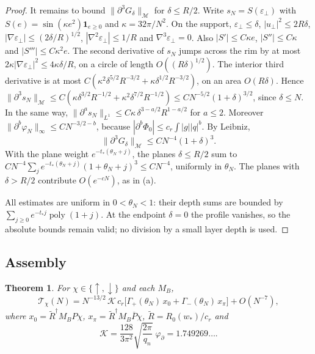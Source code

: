 \documentclass[11pt]{amsart}
\newtheorem{theorem}{Theorem}[section]
\theoremstyle{definition}
\theoremstyle{remark}
\newcommand{\cK}{\mathcal{K}}
\newcommand{\up}{{\uparrow}}
\newcommand{\dn}{{\downarrow}}
\begin{document}
\begin{proof}
It remains to bound $\|\partial^3G_\delta\|_{\mathcal M}$ for $\delta\le R/2$.
Write $s_N=S(\varepsilon_\perp)$ with $S(e)=\sin(\kappa e^2)\mathbf 1_{e\ge0}$
and $\kappa=32\pi/N^2$.  On the support, $\varepsilon_\perp\le\delta$,
$|u_\perp|^2\le2R\delta$, $|\nabla\varepsilon_\perp|\le(2\delta/R)^{1/2}$,
$|\nabla^2\varepsilon_\perp|\le1/R$ and $\nabla^3\varepsilon_\perp=0$.  Also
$|S'|\le C\kappa e$, $|S''|\le C\kappa$ and $|S'''|\le C\kappa^2e$.  The
second derivative of $s_N$ jumps across the rim by at most
$2\kappa|\nabla\varepsilon_\perp|^2\le4\kappa\delta/R$, on a circle of length
$O((R\delta)^{1/2})$.  The interior third derivative is at most
$C(\kappa^2\delta^{5/2}R^{-3/2}+\kappa\delta^{1/2}R^{-3/2})$, on an area
$O(R\delta)$.  Hence
$\|\partial^3s_N\|_{\mathcal M}\le C(\kappa\delta^{3/2}R^{-1/2}+\kappa^2\delta^{7/2}R^{-1/2})\le CN^{-5/2}(1+\delta)^{3/2}$,
since $\delta\le N$.  In the same way,
$\|\partial^as_N\|_{L^1}\le C\kappa\,\delta^{3-a/2}R^{1-a/2}$ for
$a\le2$.  Moreover $\|\partial^b\varphi_N\|_\infty\le CN^{-3/2-b}$, because
$|\partial^b\Phi_0|\le c_r\int|g||q|^b$.  By Leibniz,
\[
\|\partial^3G_\delta\|_{\mathcal M}\le CN^{-4}(1+\delta)^3 .
\]
With the plane weight $e^{-t_*(\theta_N+j)}$, the planes $\delta\le R/2$
sum to $CN^{-4}\sum_je^{-t_*(\theta_N+j)}(1+\theta_N+j)^3\le CN^{-4}$,
uniformly in $\theta_N$.  The planes with $\delta>R/2$ contribute
$O(e^{-cN})$, as in (a).

All estimates are uniform in $0<\theta_N<1$: their depth sums are bounded
by $\sum_{j\ge0}e^{-t_*j}\operatorname{poly}(1+j)$.
At the endpoint $\delta=0$ the profile vanishes, so the absolute bounds
remain valid; no division by a small layer depth is used.
\end{proof}

\subsection{Assembly}
\begin{theorem}\label{thm:T}
For $\chi\in\{\up,\dn\}$ and each $M_B$,
\[
\mathcal T_\chi(N)=N^{-13/2}\,\cK\,c_r\bigl[\Gamma_+(\theta_N)\,x_0+\Gamma_-(\theta_N)\,x_\pi\bigr]+O(N^{-7}),
\]
where $x_0=\tilde R^\dagger M_BP\chi$, $x_\pi=\tilde R^\dagger M_B\overline P\chi$,
$\tilde R=R_0(w_*)/c_r$ and
\[
\cK=\frac{128}{3\pi^2}\sqrt{\frac{2\pi}{q_n}}\;\varphi_\partial=1.749269\ldots .
\]
\end{theorem}
\end{document}

